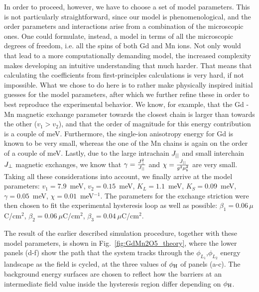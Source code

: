 In order to proceed, however, we have to choose a set of model parameters. This is not particularly straightforward, since our model is phenomenological, and the order parameters and interactions arise from a combination of the microscopic ones.
One could formulate, instead, a model in terms of all the microscopic degrees of freedom, i.e. all the spins of both Gd and Mn ions.
Not only would that lead to a more computationally demanding model, the increased complexity makes developing an intuitive understanding that much harder.
That means that calculating the coefficients from first-principles calculations is very hard, if not impossible.
What we chose to do here is to rather make physically inspired initial guesses for the model parameters, after which we further refine these in order to best reproduce the experimental behavior.
We know, for example, that the Gd - Mn magnetic exchange parameter towards the closest chain is larger than towards the other ($v_1>v_2$), and that the order of magnitude for this energy contribution is a couple of meV.
Furthermore, the single-ion anisotropy energy for Gd is known to be very small, whereas the one of the Mn chains is again on the order of a couple of meV.
Lastly, due to the large intrachain $J_{||}$ and small interchain $J_{\perp}$ magnetic exchanges, we know that $\gamma = \frac{J_{\perp}^2}{J_{||}}$ and $\chi = \frac{J_{||}}{g^2\mu_b^2}$ are very small.
Taking all these considerations into account, we finally arrive at the model parameters:  
$v_1 = 7.9$~meV, $v_2 = 0.15$~meV, $K_L = 1.1$~meV, $K_S = 0.09$~meV, $\gamma = 0.05$~meV, $\chi=0.01$~meV$^{-1}$.
The parameters for the exchange striction were then chosen to fit the experimental hysteresis loop as well as possible:
${\beta_1 = 0.06\,\mu}$C/cm$^2$, $\beta_2 = 0.06\:\mu$C/cm$^2$, $\beta_3 = 0.04\:\mu$C/cm$^2$.

The result of the earlier described simulation procedure, together with these model parameters, is shown in Fig.~\ref{fig:GdMn2O5_theory}, where the lower panels (d-f) show the path that the system tracks through the $\phi_{L_1}$,$\phi_{L_2}$ energy landscape as the field is cycled, at the three values of $\phi_{\rm H}$ of panels (a-c).
The background energy surfaces are chosen to reflect how the barriers at an intermediate field value inside the hysteresis region differ depending on $\phi_{\rm H}$.

